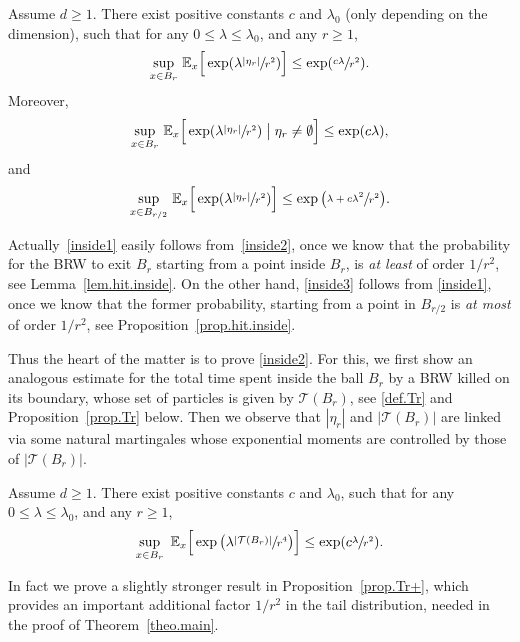 \begin{theorem}\label{theo.inside}
Assume $d\ge 1$. There exist positive constants $c$ and $\lambda_0$ (only depending on the dimension), such that for any $0\le \lambda\le \lambda_0$, and any $r\ge 1$,
\begin{equation}\label{inside2}
\sup_{x\in B_r}\, \mathbb E_x\Big[\exp(\lambda \sfrac{|\eta_r|}{r^2})\Big]
\le \exp(\sfrac{c\lambda}{r^2}).
\end{equation}
Moreover,
\begin{equation}\label{inside1}
\sup_{x\in B_r} \, \mathbb E_x\Big[\exp(\lambda \sfrac{|\eta_r|}{r^2})\bigm| \eta_r\neq \emptyset\Big] \le \exp(c\lambda),
\end{equation}
and
\begin{equation}\label{inside3}
\sup_{x\in B_{r/2}} \, \mathbb E_x\Big[\exp(\lambda \sfrac{|\eta_r|}{r^2})
\Big] \le \exp\big(\sfrac{\lambda + c\lambda^2}{r^2}\big).
\end{equation}
\end{theorem}
Actually~\eqref{inside1} easily follows from~\eqref{inside2}, once we know that the probability for the BRW to exit $B_r$ starting from a point
inside $B_r$, is {\it at least} of order $1/r^2$, see Lemma~\ref{lem.hit.inside}. On the other hand, \eqref{inside3} follows from \eqref{inside1}, once we
know that the former probability, starting from a point in $B_{r/2}$ is
{\it at most} of order $1/r^2$, see Proposition~\ref{prop.hit.inside}.

Thus the heart of the matter is to prove \eqref{inside2}.
For this, we first show an analogous estimate for
the total time spent inside the ball $B_r$ by a BRW killed on its boundary,
whose set of particles is given by $\mathcal T(B_r)$,
see \eqref{def.Tr} and Proposition~\ref{prop.Tr} below.
Then we observe that $|\eta_r|$ and $|\mathcal T(B_r)|$
are linked via some natural martingales whose exponential moments are
controlled by those of $|\mathcal T(B_r)|$.
\begin{proposition}\label{prop.Tr}
Assume $d\ge 1$. There exist positive constants $c$ and $\lambda_0$,
such that for any $0\le \lambda\le \lambda_0$, and any $r\ge 1$,
\[
\sup_{x\in B_r}\ \mathbb E_x\Big[\exp\big(\lambda\sfrac{
|\mathbf{\mathcal T}(B_r)|}{r^4}\big)\Big]
\le\exp(c\sfrac{\lambda}{r^2}).
\]
\end{proposition}
In fact we prove a slightly stronger result
in Proposition~\ref{prop.Tr+}, which provides an important
additional factor $1/r^2$ in the tail distribution,
needed in the proof of Theorem~\ref{theo.main}.

